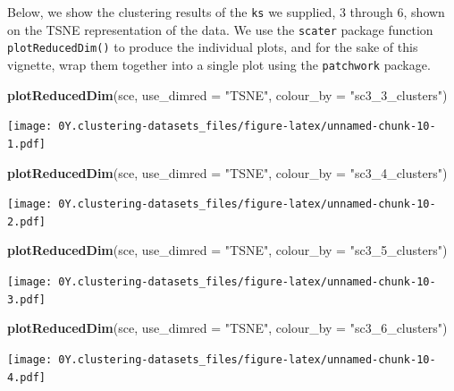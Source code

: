\documentclass[]{book}
\newenvironment{Shaded}{\begin{snugshade}}{\end{snugshade}}
\newcommand{\DataTypeTok}[1]{\textcolor[rgb]{0.13,0.29,0.53}{#1}}
\newcommand{\KeywordTok}[1]{\textcolor[rgb]{0.13,0.29,0.53}{\textbf{#1}}}
\newcommand{\NormalTok}[1]{#1}
\newcommand{\StringTok}[1]{\textcolor[rgb]{0.31,0.60,0.02}{#1}}
\begin{document}
Below, we show the clustering results of the \texttt{ks} we supplied, 3 through 6, shown on the TSNE representation of the data. We use the \texttt{scater} package function \texttt{plotReducedDim()} to produce the individual plots, and for the sake of this vignette, wrap them together into a single plot using the \texttt{patchwork} package.

\begin{Shaded}
\begin{Highlighting}[]
\KeywordTok{plotReducedDim}\NormalTok{(sce, }\DataTypeTok{use_dimred =} \StringTok{"TSNE"}\NormalTok{, }\DataTypeTok{colour_by =} \StringTok{"sc3_3_clusters"}\NormalTok{)}
\end{Highlighting}
\end{Shaded}

\texttt{[image: 0Y.clustering-datasets\_files/figure-latex/unnamed-chunk-10-1.pdf]}

\begin{Shaded}
\begin{Highlighting}[]
\KeywordTok{plotReducedDim}\NormalTok{(sce, }\DataTypeTok{use_dimred =} \StringTok{"TSNE"}\NormalTok{, }\DataTypeTok{colour_by =} \StringTok{"sc3_4_clusters"}\NormalTok{)}
\end{Highlighting}
\end{Shaded}

\texttt{[image: 0Y.clustering-datasets\_files/figure-latex/unnamed-chunk-10-2.pdf]}

\begin{Shaded}
\begin{Highlighting}[]
\KeywordTok{plotReducedDim}\NormalTok{(sce, }\DataTypeTok{use_dimred =} \StringTok{"TSNE"}\NormalTok{, }\DataTypeTok{colour_by =} \StringTok{"sc3_5_clusters"}\NormalTok{)}
\end{Highlighting}
\end{Shaded}

\texttt{[image: 0Y.clustering-datasets\_files/figure-latex/unnamed-chunk-10-3.pdf]}

\begin{Shaded}
\begin{Highlighting}[]
\KeywordTok{plotReducedDim}\NormalTok{(sce, }\DataTypeTok{use_dimred =} \StringTok{"TSNE"}\NormalTok{, }\DataTypeTok{colour_by =} \StringTok{"sc3_6_clusters"}\NormalTok{)}
\end{Highlighting}
\end{Shaded}

\texttt{[image: 0Y.clustering-datasets\_files/figure-latex/unnamed-chunk-10-4.pdf]}
\end{document}
